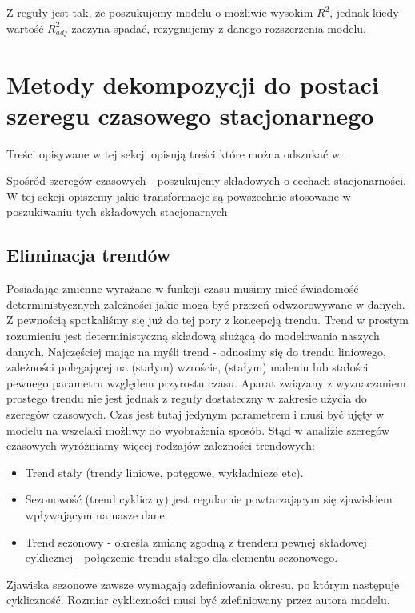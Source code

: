 \documentclass[10pt,a4paper]{book}
\begin{document}
Z reguły jest tak, że poszukujemy modelu o możliwie wysokim $R^2$, jednak kiedy wartość $R_{adj}^2$ zaczyna spadać, rezygnujemy z danego rozszerzenia modelu.

\section{Metody dekompozycji do postaci szeregu czasowego stacjonarnego}

Treści opisywane w tej sekcji opisują treści które można odszukać w \citep{montgomery2015introduction}.

Spośród szeregów czasowych - poszukujemy składowych o cechach stacjonarności. W tej sekcji opiszemy jakie transformacje są powszechnie stosowane w poszukiwaniu tych składowych stacjonarnych

\subsection{Eliminacja trendów}

Posiadając zmienne wyrażane w funkcji czasu musimy mieć świadomość deterministycznych zależności jakie mogą być przezeń odwzorowywane w danych. Z pewnością spotkaliśmy się już do tej pory z koncepcją trendu. Trend w prostym rozumieniu jest deterministyczną składową służącą do modelowania naszych danych. Najczęściej mając na myśli trend - odnosimy się do trendu liniowego, zależności polegającej na (stałym) wzroście, (stałym) maleniu lub stałości pewnego parametru względem przyrostu czasu. Aparat związany z wyznaczaniem prostego trendu nie jest jednak z reguły dostateczny w zakresie użycia do szeregów czasowych. Czas jest tutaj jedynym parametrem i musi być ujęty w modelu na wszelaki możliwy do wyobrażenia sposób. 
Stąd w analizie szeregów czasowych wyróżniamy więcej rodzajów zależności trendowych:

\begin{itemize}
\item Trend stały (trendy liniowe, potęgowe, wykładnicze etc).
\item Sezonowość (trend cykliczny) jest regularnie powtarzającym się zjawiskiem wpływającym na nasze dane. 
\item Trend sezonowy - określa zmianę zgodną z trendem pewnej składowej cyklicznej - połączenie trendu stałego dla elementu sezonowego. 
\end{itemize}

Zjawiska sezonowe zawsze wymagają zdefiniowania okresu, po którym następuje cykliczność. Rozmiar cykliczności musi być zdefiniowany przez autora modelu.
\end{document}
